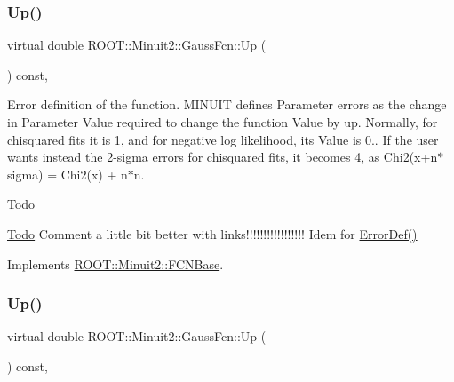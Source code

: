 \subsubsection{\texorpdfstring{Up()}{Up()}\hspace{0.1cm}{\footnotesize\ttfamily [1/2]}}
{\footnotesize\ttfamily virtual double R\+O\+O\+T\+::\+Minuit2\+::\+Gauss\+Fcn\+::\+Up (\begin{DoxyParamCaption}{ }\end{DoxyParamCaption}) const\hspace{0.3cm}{\ttfamily [inline]}, {\ttfamily [virtual]}}

Error definition of the function. M\+I\+N\+U\+IT defines Parameter errors as the change in Parameter Value required to change the function Value by up. Normally, for chisquared fits it is 1, and for negative log likelihood, its Value is 0.. If the user wants instead the 2-\/sigma errors for chisquared fits, it becomes 4, as Chi2(x+n$\ast$sigma) = Chi2(x) + n$\ast$n.

\begin{DoxyRefDesc}{Todo}
\item[\mbox{\hyperlink{todo__todo000001}{Todo}}]Comment a little bit better with links!!!!!!!!!!!!!!!!! Idem for \mbox{\hyperlink{classROOT_1_1Minuit2_1_1FCNBase_ac4592475c58a65b037ba97ab5f3cba10}{Error\+Def()}}\end{DoxyRefDesc}


Implements \mbox{\hyperlink{classROOT_1_1Minuit2_1_1FCNBase_a04ef08ddad92ce8d89d498efbe021c39}{R\+O\+O\+T\+::\+Minuit2\+::\+F\+C\+N\+Base}}.

\mbox{\label{classROOT_1_1Minuit2_1_1GaussFcn_a7e73468f853c287df3b5da240c3b5bb5}} 
\subsubsection{\texorpdfstring{Up()}{Up()}\hspace{0.1cm}{\footnotesize\ttfamily [2/2]}}
{\footnotesize\ttfamily virtual double R\+O\+O\+T\+::\+Minuit2\+::\+Gauss\+Fcn\+::\+Up (\begin{DoxyParamCaption}{ }\end{DoxyParamCaption}) const\hspace{0.3cm}{\ttfamily [inline]}, {\ttfamily [virtual]}}

